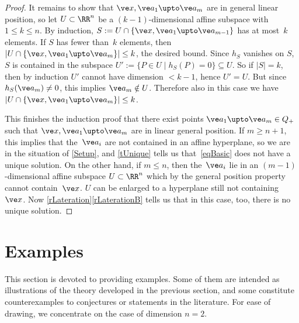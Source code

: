 \documentclass[reqno]{amsart}
\begin{document}
\begin{proof}
  It remains to show that $\ve x,\ve a_1 \upto \ve a_m$ are in general
  linear position, so let $U \subset \RR^n$ be a $(k-1)$-dimensional
  affine subspace with $1 \le k \le n$. By induction,
  $S := U \cap \{\ve x,\ve a_1 \upto \ve a_{m-1}\}$ has at most~$k$
  elements. If $S$ has fewer than~$k$ elements, then
  $|U \cap \{\ve x,\ve a_1 \upto \ve a_m\}| \le k$, the desired
  bound. Since $h_S$ vanishes on $S$, $S$ is contained in the subspace
  $U' := \{P \in U \mid h_S(P) = 0\} \subseteq U$. So if $|S| = k$,
  then by induction $U'$ cannot have dimension $< k - 1$, hence
  $U' = U$. But since $h_S(\ve a_m) \ne 0$, this implies
  $\ve a_m \notin U$. Therefore also in this case we have
  $|U \cap \{\ve x,\ve a_1 \upto \ve a_m\}| \le k$.

  This finishes the induction proof that there exist points
  $\ve a_1 \upto \ve a_m \in Q_+$ such that
  $\ve x,\ve a_1 \upto \ve a_m$ are in linear general position. If
  $m \ge n+1$, this implies that the~$\ve a_i$ are not contained in an
  affine hyperplane, so we are in the situation of \cref{Setup}, and
  \cref{tUnique} tells us that~\eqref{eqBasic} does not have a unique
  solution. On the other hand, if $m \le n$, then the~$\ve a_i$ lie in
  an $(m-1)$-dimensional affine subspace $U \subset \RR^n$ which by
  the general position property cannot contain~$\ve x$. $U$ can be
  enlarged to a hyperplane still not containing~$\ve x$. Now
  \cref{rLateration}\ref{rLaterationB} tells us that in this case,
  too, there is no unique solution.
\end{proof}

\section{Examples} \label{sExamples}

This section is devoted to providing examples. Some of them are intended as illustrations of the theory developed in the previous section, and some constitute counterexamples to conjectures or statements in the literature. For ease of drawing, we concentrate
on the case of dimension $n = 2$.
\end{document}
